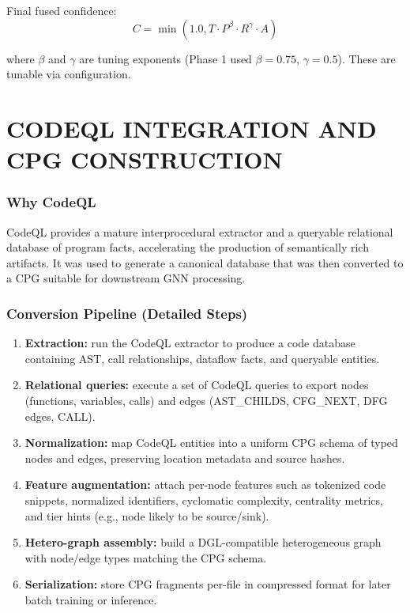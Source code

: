Final fused confidence:
\begin{equation}
C = \min\left(1.0, T \cdot P^\beta \cdot R^\gamma \cdot A\right)
\label{eq:confidence_final}
\end{equation}

where $\beta$ and $\gamma$ are tuning exponents (Phase 1 used $\beta = 0.75$, $\gamma = 0.5$). These are tunable via configuration.

\section{\uppercase{CodeQL Integration and CPG Construction}}

\subsubsection{Why CodeQL}

CodeQL provides a mature interprocedural extractor and a queryable relational database of program facts, accelerating the production of semantically rich artifacts. It was used to generate a canonical database that was then converted to a CPG suitable for downstream GNN processing.

\subsubsection{Conversion Pipeline (Detailed Steps)}

\begin{enumerate}
    \item \textbf{Extraction:} run the CodeQL extractor to produce a code database containing AST, call relationships, dataflow facts, and queryable entities.

    \item \textbf{Relational queries:} execute a set of CodeQL queries to export nodes (functions, variables, calls) and edges (AST\_CHILDS, CFG\_NEXT, DFG edges, CALL).

    \item \textbf{Normalization:} map CodeQL entities into a uniform CPG schema of typed nodes and edges, preserving location metadata and source hashes.

    \item \textbf{Feature augmentation:} attach per-node features such as tokenized code snippets, normalized identifiers, cyclomatic complexity, centrality metrics, and tier hints (e.g., node likely to be source/sink).

    \item \textbf{Hetero-graph assembly:} build a DGL-compatible heterogeneous graph with node/edge types matching the CPG schema.

    \item \textbf{Serialization:} store CPG fragments per-file in compressed format for later batch training or inference.
\end{enumerate}

